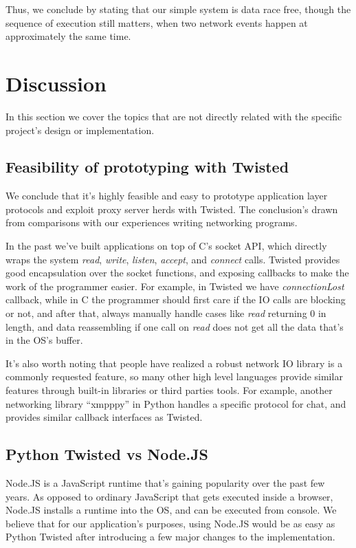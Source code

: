 \documentclass[letterpaper,twocolumn,10pt]{article}
\begin{document}
Thus, we conclude by stating that our simple system is data race free, though the sequence of execution still matters, when two network events happen at approximately the same time.

\section{Discussion}
\label{DiscussionSection}

In this section we cover the topics that are not directly related with the specific project's design or implementation.

\subsection{Feasibility of prototyping with Twisted}

We conclude that it's highly feasible and easy to prototype application layer protocols and exploit proxy server herds with Twisted. The conclusion's drawn from comparisons with our experiences writing networking programs. 

In the past we've built applications on top of C's socket API, which directly wraps the system \textit{read}, \textit{write}, \textit{listen}, \textit{accept}, and \textit{connect} calls. Twisted provides good encapsulation over the socket functions, and exposing callbacks to make the work of the programmer easier. For example, in Twisted we have \textit{connectionLost} callback, while in C the programmer should first care if the IO calls are blocking or not, and after that, always manually handle cases like \textit{read} returning 0 in length, and data reassembling if one call on \textit{read} does not get all the data that's in the OS's buffer. 

It's also worth noting that people have realized a robust network IO library is a commonly requested feature, so many other high level languages provide similar features through built-in libraries or third parties tools. For example, another networking library ``xmpppy'' in Python handles a specific protocol for chat\cite{XMPP}, and provides similar callback interfaces as Twisted.

\subsection{Python Twisted vs Node.JS}

Node.JS is a JavaScript runtime that's gaining popularity over the past few years. As opposed to ordinary JavaScript that gets executed inside a browser, Node.JS installs a runtime into the OS, and can be executed from console. We believe that for our application's purposes, using Node.JS would be as easy as Python Twisted after introducing a few major changes to the implementation.
\end{document}
